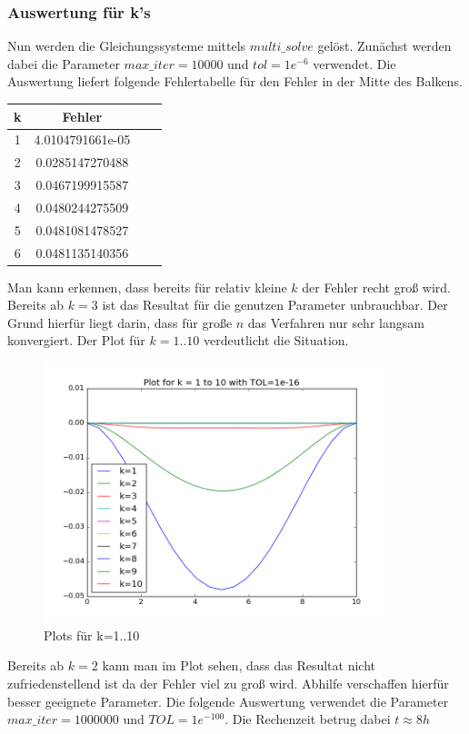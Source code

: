 \documentclass[12pt,titlepage]{article}
\begin{document}
	 	\subsubsection{Auswertung für k's}
	 		Nun werden die Gleichungssysteme mittels $multi\_solve$ gelöst. Zunächst werden dabei die Parameter $max\_iter=10000$ und $tol=1e^{-6}$ verwendet. Die Auswertung liefert folgende Fehlertabelle für den Fehler in der Mitte des Balkens.	 		
			\begin{table}[!h]
				\centering
				\begin{tabular}{c c c c}
					\bf k & \bf Fehler\\
					\hline
					1	& 4.0104791661e-05 \\ 
					2   & 0.0285147270488 \\
					3	& 0.0467199915587 \\
					4	& 0.0480244275509\\
					5   & 0.0481081478527\\
					6	& 0.0481135140356\\
				\end{tabular}
			\end{table}
			Man kann erkennen, dass bereits für relativ kleine $k$ der Fehler recht groß wird. Bereits ab $k=3$ ist das Resultat für die genutzen Parameter unbrauchbar. Der Grund hierfür liegt darin, dass für große $n$ das Verfahren nur sehr langsam konvergiert. Der Plot für $k=1..10$ verdeutlicht die Situation.
		 	\begin{figure}[H] 
	 			\centering
	 			\includegraphics[width=0.9\textwidth]{ks.png}
	 			\caption{Plots für k=1..10}
	 			\label{fig:Bild2}
	 		\end{figure}
	 		Bereits ab $k=2$ kann man im Plot sehen, dass das Resultat nicht zufriedenstellend ist da der Fehler viel zu groß wird. Abhilfe verschaffen hierfür besser geeignete Parameter. Die folgende Auswertung verwendet die Parameter $max\_iter=1000000$ und $TOL = 1e^{-100}$. Die Rechenzeit betrug dabei $t \approx 8h$
\end{document}
